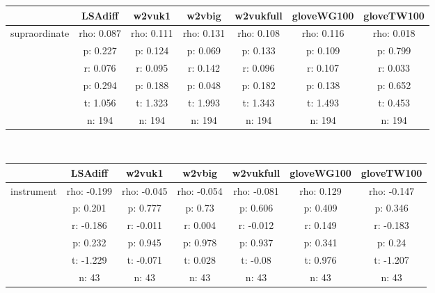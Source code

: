 \documentclass{article}
\begin{document}
\begin{tabular}{ccccccc|}\cline{2-7}
&\multicolumn{1}{|c}{LSAdiff} & w2vuk1 & w2vbig & w2vukfull & gloveWG100 & gloveTW100 \\\hline
\multicolumn{1}{|c|}{\multirow{6}{*}{supraordinate}} & rho: 0.087 & rho: 0.111 & rho: 0.131 & rho: 0.108 & rho: 0.116 & rho: 0.018 \\
\multicolumn{1}{|c|}{} & p: 0.227 & p: 0.124 & p: 0.069 & p: 0.133 & p: 0.109 & p: 0.799 \\
\multicolumn{1}{|c|}{} & r: 0.076 & r: 0.095 & r: 0.142 & r: 0.096 & r: 0.107 & r: 0.033 \\
\multicolumn{1}{|c|}{} & p: 0.294 & p: 0.188 & p: 0.048 & p: 0.182 & p: 0.138 & p: 0.652 \\
\multicolumn{1}{|c|}{} & t: 1.056 & t: 1.323 & t: 1.993 & t: 1.343 & t: 1.493 & t: 0.453 \\
\multicolumn{1}{|c|}{} & n: 194 & n: 194 & n: 194 & n: 194 & n: 194 & n: 194 \\
\hline
\end{tabular}\\
\begin{tabular}{ccccccc|}\cline{2-7}
&\multicolumn{1}{|c}{LSAdiff} & w2vuk1 & w2vbig & w2vukfull & gloveWG100 & gloveTW100 \\\hline
\multicolumn{1}{|c|}{\multirow{6}{*}{instrument}} & rho: -0.199 & rho: -0.045 & rho: -0.054 & rho: -0.081 & rho: 0.129 & rho: -0.147 \\
\multicolumn{1}{|c|}{} & p: 0.201 & p: 0.777 & p: 0.73 & p: 0.606 & p: 0.409 & p: 0.346 \\
\multicolumn{1}{|c|}{} & r: -0.186 & r: -0.011 & r: 0.004 & r: -0.012 & r: 0.149 & r: -0.183 \\
\multicolumn{1}{|c|}{} & p: 0.232 & p: 0.945 & p: 0.978 & p: 0.937 & p: 0.341 & p: 0.24 \\
\multicolumn{1}{|c|}{} & t: -1.229 & t: -0.071 & t: 0.028 & t: -0.08 & t: 0.976 & t: -1.207 \\
\multicolumn{1}{|c|}{} & n: 43 & n: 43 & n: 43 & n: 43 & n: 43 & n: 43 \\
\hline
\end{tabular}\\
\end{document}
